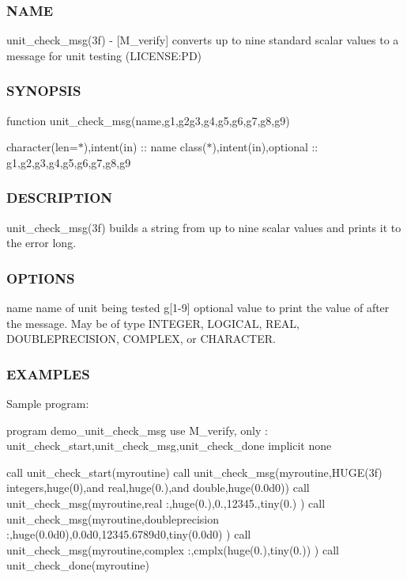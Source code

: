 \subsubsection*{N\+A\+ME}

unit\+\_\+check\+\_\+msg(3f) -\/ \mbox{[}M\+\_\+verify\mbox{]} converts up to nine standard scalar values to a message for unit testing (L\+I\+C\+E\+N\+SE\+:PD) \subsubsection*{S\+Y\+N\+O\+P\+S\+IS}

function unit\+\_\+check\+\_\+msg(name,g1,g2g3,g4,g5,g6,g7,g8,g9)

character(len=$\ast$),intent(in) \+:\+: name class($\ast$),intent(in),optional \+:\+: g1,g2,g3,g4,g5,g6,g7,g8,g9 \subsubsection*{D\+E\+S\+C\+R\+I\+P\+T\+I\+ON}

unit\+\_\+check\+\_\+msg(3f) builds a string from up to nine scalar values and prints it to the error long.

\subsubsection*{O\+P\+T\+I\+O\+NS}

name name of unit being tested g\mbox{[}1-\/9\mbox{]} optional value to print the value of after the message. May be of type I\+N\+T\+E\+G\+ER, L\+O\+G\+I\+C\+AL, R\+E\+AL, D\+O\+U\+B\+L\+E\+P\+R\+E\+C\+I\+S\+I\+ON, C\+O\+M\+P\+L\+EX, or C\+H\+A\+R\+A\+C\+T\+ER.

\subsubsection*{E\+X\+A\+M\+P\+L\+ES}

Sample program\+:

program demo\+\_\+unit\+\_\+check\+\_\+msg use M\+\_\+verify, only \+: unit\+\_\+check\+\_\+start,unit\+\_\+check\+\_\+msg,unit\+\_\+check\+\_\+done implicit none

call unit\+\_\+check\+\_\+start(\textquotesingle{}myroutine\textquotesingle{}) call unit\+\_\+check\+\_\+msg(\textquotesingle{}myroutine\textquotesingle{},\textquotesingle{}H\+U\+G\+E(3f) integers\textquotesingle{},huge(0),\textquotesingle{}and real\textquotesingle{},huge(0.),\textquotesingle{}and double\textquotesingle{},huge(0.\+0d0)) call unit\+\_\+check\+\_\+msg(\textquotesingle{}myroutine\textquotesingle{},\textquotesingle{}real \+:\textquotesingle{},huge(0.),0.,12345.,tiny(0.) ) call unit\+\_\+check\+\_\+msg(\textquotesingle{}myroutine\textquotesingle{},\textquotesingle{}doubleprecision \+:\textquotesingle{},huge(0.\+0d0),0.\+0d0,12345.\+6789d0,tiny(0.\+0d0) ) call unit\+\_\+check\+\_\+msg(\textquotesingle{}myroutine\textquotesingle{},\textquotesingle{}complex \+:\textquotesingle{},cmplx(huge(0.),tiny(0.)) ) call unit\+\_\+check\+\_\+done(\textquotesingle{}myroutine\textquotesingle{})

